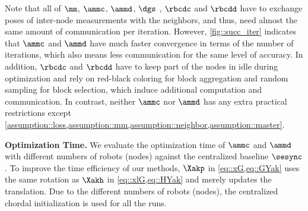  Note that all of $\mm$, $\ammc$, $\ammd$, $\dgs$ \cite{choudhary2017distributed}, $\rbcdc$ \cite{tian2019distributed} and $\rbcdd$ \cite{tian2019distributed} have to exchange poses of inter-node measurements with the neighbors, and thus, need almost the same amount of communication per iteration. However, \cref{fig::succ_iter} indicates that $\ammc$ and $\ammd$ have much faster convergence in terms of the number of iterations, which also means less communication for the same level of accuracy. In addition, $\rbcdc$ and $\rbcdd$ have to keep part of the nodes in idle during optimization and rely on red-black coloring for block aggregation and random sampling for block selection, which induce additional computation and communication. In contrast, neither $\ammc$ nor $\ammd$ has any extra practical restrictions except \cref{assumption::loss,assumption::mm,assumption::neighbor,assumption::master}.



\textbf{Optimization Time.} We evaluate the optimization time of $\ammc$ and $\ammd$ with different numbers of robots (nodes) against the centralized baseline $\sesync$ \cite{rosen2016se}. To improve the  time efficiency of our methods, $\Xakp$ in \cref{eq::xG,eq::GYak}  uses the same rotation as $\Xakh$ in \cref{eq::xlG,eq::HYak} and merely updates the translation. Due to the different numbers of robots (nodes), the centralized chordal initialization \cite{carlone2015initialization} is used for all the runs.

